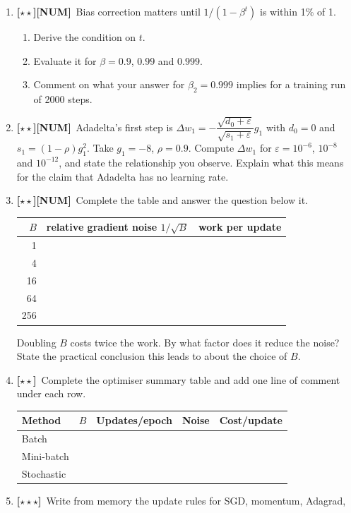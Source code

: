 \documentclass[11pt,a4paper]{article}
\newcommand{\LA}{{\footnotesize\textbf{[$\star\star\star$]}}}
\newcommand{\LB}{{\footnotesize\textbf{[$\star\star$]}}}
\newcommand{\NUM}{{\footnotesize\textbf{[NUM]}}}
\newcommand{\Q}[1]{\item[\textbf{#1}]}
\begin{document}
\begin{enumerate}[leftmargin=2.2cm]
\begin{enumerate}[label=(\alph*)]
      the problem.
  \end{enumerate}
\Q{U3.35}\LB\NUM\ Bias correction matters until $1/(1-\beta^t)$ is within 1\%
  of 1.
  \begin{enumerate}[label=(\alph*)]
    \item Derive the condition on $t$.
    \item Evaluate it for $\beta = 0.9$, $0.99$ and $0.999$.
    \item Comment on what your answer for $\beta_2 = 0.999$ implies for a
      training run of 2000 steps.
  \end{enumerate}
\Q{U3.36}\LB\NUM\ Adadelta's first step is
  $\Delta w_1 = -\dfrac{\sqrt{d_0 + \varepsilon}}{\sqrt{s_1 + \varepsilon}}g_1$
  with $d_0 = 0$ and $s_1 = (1-\rho)g_1^2$. Take $g_1 = -8$, $\rho = 0.9$.
  Compute $\Delta w_1$ for $\varepsilon = 10^{-6}$, $10^{-8}$ and $10^{-12}$,
  and state the relationship you observe. Explain what this means for the claim
  that Adadelta has no learning rate.
\Q{U3.37}\LB\NUM\ Complete the table and answer the question below it.
  \begin{center}\begin{tabular}{@{}rrr@{}}\toprule
  $B$ & relative gradient noise $1/\sqrt B$ & work per update\\
  \midrule
  1 & & \\ 4 & & \\ 16 & & \\ 64 & & \\ 256 & & \\
  \bottomrule\end{tabular}\end{center}
  Doubling $B$ costs twice the work. By what factor does it reduce the noise?
  State the practical conclusion this leads to about the choice of $B$.
\Q{U3.38}\LB\ Complete the optimiser summary table and add one line of comment
  under each row.
  \begin{center}\begin{tabular}{@{}lllll@{}}\toprule
  \textbf{Method} & $B$ & \textbf{Updates/epoch} & \textbf{Noise} & \textbf{Cost/update}\\
  \midrule
  Batch & & & & \\ Mini-batch & & & & \\ Stochastic & & & & \\
  \bottomrule\end{tabular}\end{center}
\Q{U3.39}\LA\ Write from memory the update rules for SGD, momentum, Adagrad,

\end{enumerate}
\end{document}
